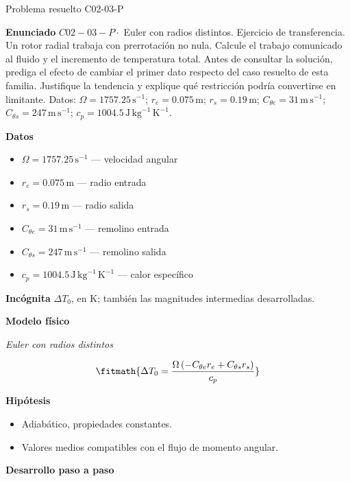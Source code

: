 \documentclass[10pt,openany]{book}
\begin{document}
\begin{studiumworked}{Problema resuelto C02-03-P}


\noindent\textbf{Enunciado}
\(C02-03-P \cdot\) Euler con radios distintos. Ejercicio de transferencia. Un rotor radial trabaja con prerrotación no nula. Calcule el trabajo comunicado al fluido y el incremento de temperatura total. Antes de consultar la solución, prediga el efecto de cambiar el primer dato respecto del caso resuelto de esta familia. Justifique la tendencia y explique qué restricción podría convertirse en limitante. Datos: \(\Omega=1757.25\, \mathrm{s}^{-1}\); \(r_e=0.075\, \mathrm{m}\); \(r_s=0.19\, \mathrm{m}\); \(C_{\theta e}=31\, \mathrm{m}\,\mathrm{s}^{-1}\); \(C_{\theta s}=247\, \mathrm{m}\,\mathrm{s}^{-1}\); \(c_p=1004.5\, \mathrm{J}\,\mathrm{kg}^{-1}\,\mathrm{K}^{-1}\).

\noindent\textbf{Datos}
\begin{itemize}
\item $\Omega = 1757.25\,\mathrm{s}^{-1}$ — velocidad angular
\item $r_e = 0.075\,\mathrm{m}$ — radio entrada
\item $r_s = 0.19\,\mathrm{m}$ — radio salida
\item $C_{\theta e} = 31\,\mathrm{m}\,\mathrm{s}^{-1}$ — remolino entrada
\item $C_{\theta s} = 247\,\mathrm{m}\,\mathrm{s}^{-1}$ — remolino salida
\item $c_p = 1004.5\,\mathrm{J}\,\mathrm{kg}^{-1}\,\mathrm{K}^{-1}$ — calor específico
\end{itemize}

\noindent\textbf{Incógnita}
$\Delta T_0$, en $\mathrm{K}$; también las magnitudes intermedias desarrolladas.

\noindent\textbf{Modelo físico}

\noindent\textit{Euler con radios distintos}

\[
\fitmath{\Delta T_0=\frac{\Omega \left(- C_{\theta e} r_e + C_{\theta s} r_s\right)}{c_p}}
\]

\noindent\textbf{Hipótesis}
\begin{itemize}
\item Adiabático, propiedades constantes.
\item Valores medios compatibles con el flujo de momento angular.
\end{itemize}

\noindent\textbf{Desarrollo paso a paso}




\end{studiumworked}
\end{document}
